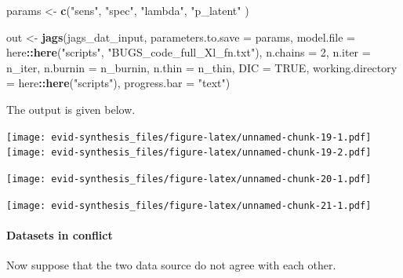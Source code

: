 \documentclass[]{article}
\newenvironment{Shaded}{\begin{snugshade}}{\end{snugshade}}
\newcommand{\CommentTok}[1]{\textcolor[rgb]{0.56,0.35,0.01}{\textit{#1}}}
\newcommand{\DataTypeTok}[1]{\textcolor[rgb]{0.13,0.29,0.53}{#1}}
\newcommand{\DecValTok}[1]{\textcolor[rgb]{0.00,0.00,0.81}{#1}}
\newcommand{\KeywordTok}[1]{\textcolor[rgb]{0.13,0.29,0.53}{\textbf{#1}}}
\newcommand{\NormalTok}[1]{#1}
\newcommand{\OperatorTok}[1]{\textcolor[rgb]{0.81,0.36,0.00}{\textbf{#1}}}
\newcommand{\OtherTok}[1]{\textcolor[rgb]{0.56,0.35,0.01}{#1}}
\newcommand{\StringTok}[1]{\textcolor[rgb]{0.31,0.60,0.02}{#1}}
\let\oldparagraph\paragraph
\renewcommand{\paragraph}[1]{\oldparagraph{#1}\mbox{}}
\begin{document}
\begin{Shaded}
\begin{Highlighting}[]
\NormalTok{params <-}
\StringTok{  }\KeywordTok{c}\NormalTok{(}\StringTok{"sens"}\NormalTok{, }\StringTok{"spec"}\NormalTok{,}
    \StringTok{"lambda"}\NormalTok{,}
    \StringTok{"p_latent"}
\NormalTok{  )}
\end{Highlighting}
\end{Shaded}

\begin{Shaded}
\begin{Highlighting}[]
\NormalTok{out <-}\StringTok{ }\KeywordTok{jags}\NormalTok{(jags_dat_input,}
            \DataTypeTok{parameters.to.save =}\NormalTok{ params,}
            \DataTypeTok{model.file =}\NormalTok{ here}\OperatorTok{::}\KeywordTok{here}\NormalTok{(}\StringTok{"scripts"}\NormalTok{, }\StringTok{"BUGS_code_full_Xl_fn.txt"}\NormalTok{),}
            \DataTypeTok{n.chains =} \DecValTok{2}\NormalTok{,}
            \DataTypeTok{n.iter =}\NormalTok{ n_iter,}
            \DataTypeTok{n.burnin =}\NormalTok{ n_burnin,}
            \DataTypeTok{n.thin =}\NormalTok{ n_thin,}
            \DataTypeTok{DIC =} \OtherTok{TRUE}\NormalTok{,}
            \DataTypeTok{working.directory =}\NormalTok{ here}\OperatorTok{::}\KeywordTok{here}\NormalTok{(}\StringTok{"scripts"}\NormalTok{),}
            \DataTypeTok{progress.bar =} \StringTok{"text"}\NormalTok{)}
\end{Highlighting}
\end{Shaded}

The output is given below.

\texttt{[image: evid-synthesis\_files/figure-latex/unnamed-chunk-19-1.pdf]}
\texttt{[image: evid-synthesis\_files/figure-latex/unnamed-chunk-19-2.pdf]}

\texttt{[image: evid-synthesis\_files/figure-latex/unnamed-chunk-20-1.pdf]}

\texttt{[image: evid-synthesis\_files/figure-latex/unnamed-chunk-21-1.pdf]}

\hypertarget{datasets-in-conflict}{%
\paragraph{Datasets in conflict}\label{datasets-in-conflict}}

Now suppose that the two data source do not agree with each other.

\begin{Shaded}
\end{Shaded}
\end{document}
